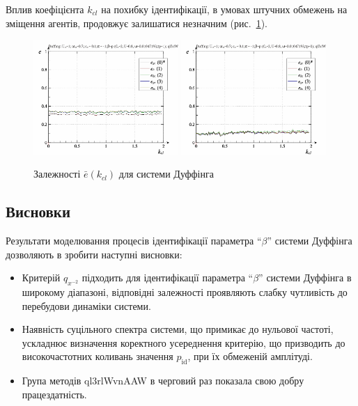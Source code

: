Вплив коефіцієнта
$ k_{cl} $ на похибку ідентифікації, в умовах штучних обмежень
на зміщення агентів, продовжує залишатися незначним
(рис.~\ref{atu:f:duff_e_k_cl}).

\begin{figure}[ht!]
\begin{center}
  \includegraphics[width=0.49\textwidth]{p/cha/duff/duff_id-p_k_cl_sign.png}
  \hfill
  \includegraphics[width=0.49\textwidth]{p/cha/duff/duff_id-p_k_cl_sin.png}
\end{center}
\caption{Залежності $ \bar{e} (k_{cl}) $ для системи Дуффінга}
\label{atu:f:duff_e_k_cl}
\end{figure}



\subsection{Висновки}%

Результати моделювання процесів ідентифікації параметра
``$\beta$'' системи Дуффінга дозволяють в зробити наступні висновки:

\begin{itemize}

  \item
    Критерій
    $q_{x^{-2}}$ підходить для ідентифікації параметра ``$\beta$'' системи
    Дуффінга в широкому діапазоні, відповідні залежності проявляють
    слабку чутливість до перебудови динаміки системи.

  \item
    Наявність суцільного спектра системи, що примикає до нульової
    частоті, ускладнює визначення коректного усереднення критерію,
    що призводить до високочастотних коливань значення
    $ p_\mathrm{id} $, при їх обмеженій амплітуді.

  \item
    Група методів ql3rlWvnAAW в черговий раз показала свою добру
    працездатність.


\end{itemize}




